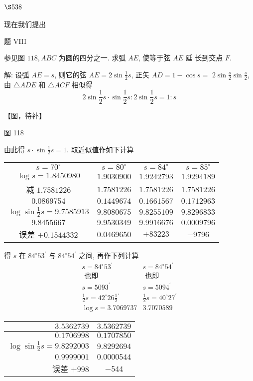 \section{$\S 538$}

现在我们提出

题 VIII

参见图 $118, A B C$ 为圆的四分之一. 求弧 $A E$, 使等于弦 $A E$ 延 长到交点 $F$.

解: 设弧 $A E=s$, 则它的弦 $A E=2 \sin \frac{1}{2} s$, 正矢 $A D=1-\cos s=$ $2 \sin \frac{s}{2} \sin \frac{s}{2}$,由 $\triangle A D E$ 和 $\triangle A C F$ 相似得
\[
2 \sin \frac{1}{2} s \cdot \sin \frac{1}{2} s: 2 \sin \frac{1}{2} s=1: s
\]

【图，待补】

图 118

由此得 $s \cdot \sin \frac{1}{2} s=1$. 取近似值作如下计算

\begin{tabular}{cccc}
$s=70^{\circ}$ & $s=80^{\circ}$ & $s=84^{\circ}$ & $s=85^{\circ}$ \\
$\log s=1.8450980$ & $1.9030900$ & $1.9242793$ & $1.9294189$ \\
减 $1.7581226$ & $1.7581226$ & $1.7581226$ & $1.7581226$ \\
\hline $0.0869754$ & $0.1449674$ & $0.1661567$ & $0.1712963$ \\
$\log \sin \frac{1}{2} s=9.7585913$ & $9.8080675$ & $9.8255109$ & $9.8296833$ \\
\hline $9.8455667$ & $9.9530349$ & $9.9916676$ & $0.0009796$ \\
误差 $+0.1544332$ & $0.0469650$ & $+83223$ & $-9796$
\end{tabular}

得 $s$ 在 $84^{\circ} 53^{\prime}$ 与 $84^{\circ} 54^{\prime}$ 之间, 再作下列计算
\[
\begin{array}{cc}
s=84^{\circ} 53^{\prime} & s=84^{\circ} 54^{\prime} \\
\text { 也即 } & \text { 也即 } \\
s=5093^{\prime} & s=5094^{\prime} \\
\frac{1}{2} s=42^{\circ} 26 \frac{1}{2}{ }^{\prime} & \frac{1}{2} s=40^{\circ} 27^{\prime} \\
\log s=3.7069737 & 3.7070589
\end{array}
\]
\begin{tabular}{rc}
$3.5362739$ & $3.5362739$ \\
\hline $0.1706998$ & $0.1707850$ \\
$\log \sin \frac{1}{2} s=9.8292003$ & $9.8292694$ \\
$0.9999001$ & $0.0000544$ \\
误差 $+998$ & $-544$
\end{tabular}

